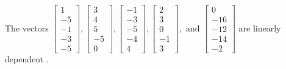 \begin{exercise}
\begin{exerciseStatement}
  \end{exerciseStatement}
  \begin{exerciseAnswer}
   The vectors \(\left[\begin{array}{r}
1 \\
-5 \\
-1 \\
-3 \\
-5
\end{array}\right] , \left[\begin{array}{r}
3 \\
4 \\
5 \\
-5 \\
0
\end{array}\right] , \left[\begin{array}{r}
-1 \\
-3 \\
-5 \\
-4 \\
4
\end{array}\right] , \left[\begin{array}{r}
2 \\
3 \\
0 \\
-1 \\
3
\end{array}\right] , \text{ and } \left[\begin{array}{r}
0 \\
-16 \\
-12 \\
-14 \\
-2
\end{array}\right]\) are 
  	 linearly dependent  .
  


  \end{exerciseAnswer}
\end{exercise}